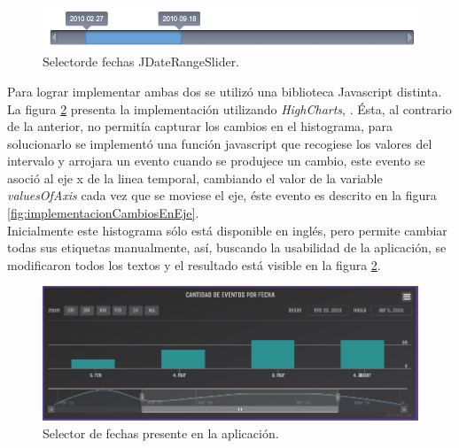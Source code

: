 \begin{figure}[H]
	\centering
	\captionsetup{justification=centering}
	\includegraphics[scale=0.6]{images/JDateRangeSlider.png}
	\caption[Selectorde fechas JDateRangeSlider.]{Selectorde fechas JDateRangeSlider.}
	\label{fig:JQRangeSlider}
\end{figure}

Para lograr implementar ambas dos se utilizó una biblioteca Javascript distinta. La figura \ref{fig:HistogramaFinal} presenta la implementación utilizando \textit{HighCharts}, \cite{Highcharts}. Ésta, al contrario de la anterior, no permitía capturar los cambios en el histograma, para solucionarlo se implementó una función javascript que recogiese los valores del intervalo y arrojara un evento cuando se produjece un cambio, este evento se asoció al eje x de la linea temporal, cambiando el valor de la variable \textit{valuesOfAxis} cada vez que se moviese el eje, éste evento es descrito en la figura \ref{fig:implementacionCambiosEnEje}.\\

Inicialmente este histograma sólo está disponible en inglés, pero permite cambiar todas sus etiquetas manualmente, así, buscando la usabilidad de la aplicación, se modificaron todos los textos y el resultado está visible en la figura \ref{fig:HistogramaFinal}.

\begin{figure}[H]
	\centering
	\captionsetup{justification=centering}
	\includegraphics[scale=0.6]{images/Histograma.png}
	\caption[Selector de fechas presente en la aplicación.]{Selector de fechas presente en la aplicación.}
	\label{fig:HistogramaFinal}
\end{figure}

